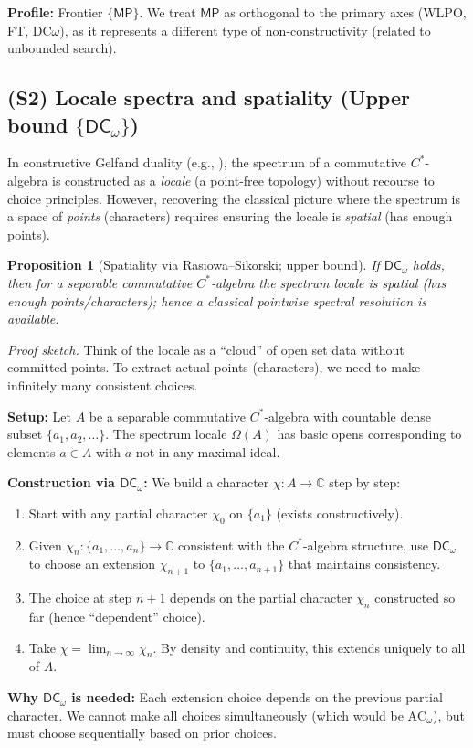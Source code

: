 \documentclass[11pt]{article}
\newcommand{\DCw}{\mathsf{DC}_{\omega}}
\newcommand{\MP}{\mathsf{MP}}
\newcommand{\leanok}{\text{\tiny [✓ Lean]}}
\theoremstyle{plain}
\newtheorem{proposition}[theorem]{Proposition}
\theoremstyle{definition}
\theoremstyle{remark}
\newenvironment{prfsketch}{\noindent\textit{Proof sketch.} }{}
\newcommand{\C}{\mathbb{C}}
\newcommand{\ACw}{\mathrm{AC}_\omega}
\begin{document}
\noindent\textbf{Profile:} Frontier $\{\MP\}$. We treat $\MP$ as orthogonal to the primary axes (WLPO, FT, DC$\omega$), as it represents a different type of non-constructivity (related to unbounded search).

\subsection{(S2) Locale spectra and spatiality (Upper bound $\{\DCw\}$)} \leanok

In constructive Gelfand duality (e.g., \cite{CoquandSpitters}), the spectrum of a commutative $C^*$-algebra is constructed as a \emph{locale} (a point-free topology) without recourse to choice principles. However, recovering the classical picture where the spectrum is a space of \emph{points} (characters) requires ensuring the locale is \emph{spatial} (has enough points).

\begin{proposition}[Spatiality via Rasiowa--Sikorski; upper bound] \leanok
If $\DCw$ holds, then for a \emph{separable} commutative $C^*$-algebra the spectrum locale is spatial (has enough points/characters); hence a classical pointwise spectral resolution is available.
\end{proposition}

\begin{prfsketch}
Think of the locale as a ``cloud'' of open set data without committed points. To extract actual points (characters), we need to make infinitely many consistent choices. 

\textbf{Setup:} Let $A$ be a separable commutative $C^*$-algebra with countable dense subset $\{a_1, a_2, \ldots\}$.
The spectrum locale $\Omega(A)$ has basic opens corresponding to elements $a \in A$ with $a$ not in any maximal ideal.

\textbf{Construction via $\DCw$:} 
We build a character $\chi: A \to \C$ step by step:
\begin{enumerate}
\item Start with any partial character $\chi_0$ on $\{a_1\}$ (exists constructively).
\item Given $\chi_n: \{a_1, \ldots, a_n\} \to \C$ consistent with the $C^*$-algebra structure, use $\DCw$ to choose an extension $\chi_{n+1}$ to $\{a_1, \ldots, a_{n+1}\}$ that maintains consistency.
\item The choice at step $n+1$ depends on the partial character $\chi_n$ constructed so far (hence ``dependent'' choice).
\item Take $\chi = \lim_{n \to \infty} \chi_n$. By density and continuity, this extends uniquely to all of $A$.
\end{enumerate}

\textbf{Why $\DCw$ is needed:} Each extension choice depends on the previous partial character. We cannot make all choices simultaneously (which would be $\ACw$), but must choose sequentially based on prior choices.
\end{prfsketch}
\end{document}
